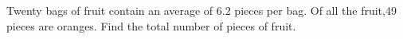 Twenty bags of fruit contain an average of 6.2 pieces per bag. Of all the fruit,49 pieces are oranges. Find the total number of pieces of fruit.

